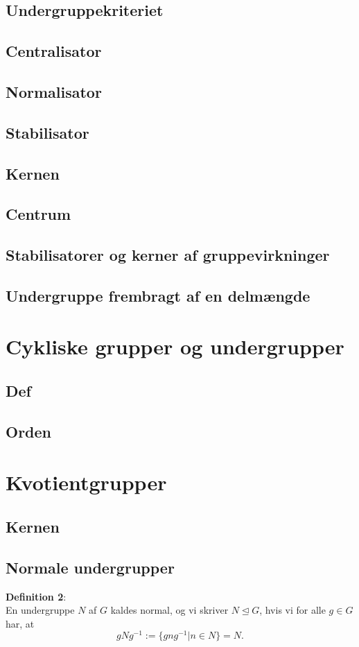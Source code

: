 \documentclass[11pt]{article}
\begin{document}
\subsection*{Undergruppekriteriet}
\subsection*{Centralisator}
\subsection*{Normalisator}
\subsection*{Stabilisator}
\subsection*{Kernen}
\subsection*{Centrum}
\subsection*{Stabilisatorer og kerner af gruppevirkninger}
\subsection*{Undergruppe frembragt af en delmængde}

\section*{Cykliske grupper og undergrupper}
\subsection*{Def}
\subsection*{Orden}

\section*{Kvotientgrupper}
\subsection*{Kernen}
\subsection*{Normale undergrupper}
\textbf{Definition 2}:\\
En undergruppe $N$ af $G$ kaldes normal, og vi skriver $N \trianglelefteq G$, hvis vi for alle $g \in G$ har, at\\
$$gNg^{-1} := \{ gng^{-1} | n \in N \} = N.$$
\end{document}
